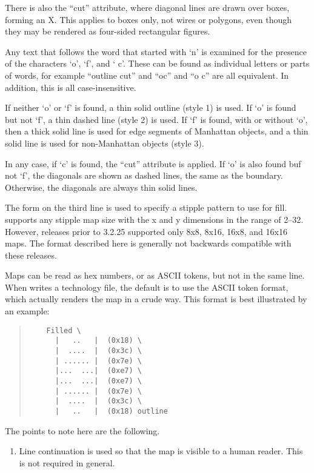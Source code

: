 \begin{description}
There is also the ``cut'' attribute, where diagonal lines are drawn
over boxes, forming an X.  This applies to boxes only, not wires or
polygons, even though they may be rendered as four-sided rectangular
figures.

Any text that follows the word that started with `{\vt n}' is examined
for the presence of the characters `{\vt o}', `{\vt f}', and `{\vt
c}'.  These can be found as individual letters or parts of words, for
example ``{\vt outline cut}'' and ``{\vt oc}'' and ``{\vt o c}'' are
all equivalent.  In addition, this is all case-insensitive.

If neither `{\vt o}' or `{\vt f}' is found, a thin solid outline
(style 1) is used.  If `{\vt o}' is found but not `{\vt f}', a thin
dashed line (style 2) is used.  If `{\vt f}' is found, with or without
`{\vt o}', then a thick solid line is used for edge segments of
Manhattan objects, and a thin solid line is used for non-Manhattan
objects (style 3).

In any case, if `{\vt c}' is found, the ``cut'' attribute is applied. 
If `{\vt o}' is also found buf not `{\vt f}', the diagonals are shown
as dashed lines, the same as the boundary.  Otherwise, the diagonals
are always thin solid lines.

The form on the third line is used to specify a stipple pattern to
use for fill.  {\Xic} supports any stipple map size with the x and y
dimensions in the range of 2--32.  However, {\Xic} releases prior to
3.2.25 supported only 8x8, 8x16, 16x8, and 16x16 maps.  The format
described here is generally not backwards compatible with these
releases.

Maps can be read as hex numbers, or as ASCII tokens, but not in the
same line.  When {\Xic} writes a technology file, the default is to
use the ASCII token format, which actually renders the map in a crude
way.  This format is best illustrated by an example:

\begin{quote}
\begin{verbatim}
    Filled \
      |   ..   |  (0x18) \
      |  ....  |  (0x3c) \
      | ...... |  (0x7e) \
      |...  ...|  (0xe7) \
      |...  ...|  (0xe7) \
      | ...... |  (0x7e) \
      |  ....  |  (0x3c) \
      |   ..   |  (0x18) outline
\end{verbatim}
\end{quote}

The points to note here are the following.
\begin{enumerate}
\item{Line continuation is used so that the map is visible to a human
reader.  This is not required in general.}


\end{enumerate}
\end{description}
